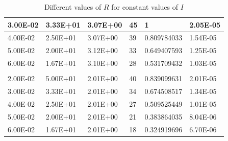 \documentclass{article}
\begin{document}
\begin{table}[H]
\begin{tabular}{|l|l|l|l|l|l|}
3.00E-02  & 3.33E+01      & 3.07E+00  & 45          & 1           & 2.05E-05   \\ \hline
4.00E-02  & 2.50E+01      & 3.07E+00  & 39          & 0.809784033 & 1.54E-05   \\ \hline
5.00E-02  & 2.00E+01      & 3.12E+00  & 33          & 0.649407593 & 1.25E-05   \\ \hline
6.00E-02  & 1.67E+01      & 3.10E+00  & 28          & 0.531709432 & 1.03E-05   \\ \hline
          &               &           &             &             &            \\ \hline
2.00E-02  & 5.00E+01      & 2.01E+00  & 40          & 0.839099631 & 2.01E-05   \\ \hline
3.00E-02  & 3.33E+01      & 2.01E+00  & 34          & 0.674508517 & 1.34E-05   \\ \hline
4.00E-02  & 2.50E+01      & 2.01E+00  & 27          & 0.509525449 & 1.01E-05   \\ \hline
5.00E-02  & 2.00E+01      & 2.01E+00  & 21          & 0.383864035 & 8.04E-06   \\ \hline
6.00E-02  & 1.67E+01      & 2.01E+00  & 18          & 0.324919696 & 6.70E-06   \\ \hline
\end{tabular}
\caption{Different values of \(R\) for constant values of \(I\)}
\label{tb:r}
\end{table}
\end{document}
